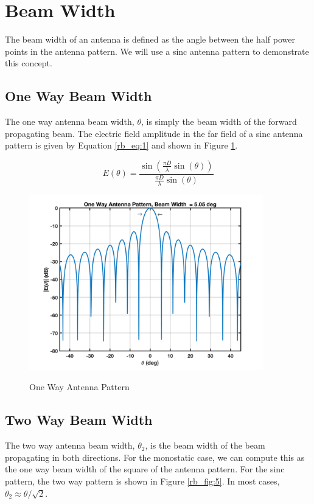 \section{Beam Width}
The beam width of an antenna is defined as the angle between the half power points in the antenna pattern. We will use a sinc antenna pattern to demonstrate this concept.

\subsection{One Way Beam Width}
The one way antenna beam width, $\theta$, is simply the beam width of the forward propagating beam. The electric field amplitude in the far field of a sinc antenna pattern is given by Equation \ref{rb_eq:1} and shown in Figure \ref{rb_fig:4}.

\begin{equation}
\label{rb_eq:1}
E(\theta) = \frac{\sin\left(\frac{\pi D}{\lambda}\sin(\theta) \right)}{\frac{\pi D}{\lambda}\sin(\theta)}
\end{equation}

\begin{figure}[H]
  \begin{center}
\includegraphics[width=4in]{../media/multistatic/sinc_antenna_pattern_one_way.png}
  \end{center}
  \renewcommand{\baselinestretch}{1} \small\normalsize
  \begin{quote}
    \caption[One Way Antenna Pattern]{One Way Antenna Pattern\label{rb_fig:4}}
  \end{quote}
\end{figure}
\renewcommand{\baselinestretch}{2} \small\normalsize

\subsection{Two Way Beam Width}
The two way antenna beam width, $\theta_2$, is the beam width of the beam propagating in both directions. For the monostatic case, we can compute this as the one way beam width of the square of the antenna pattern. For the sinc pattern, the two way pattern is shown in Figure \ref{rb_fig:5}. In most cases, $\theta_2 \approx \theta/\sqrt{2}$.


